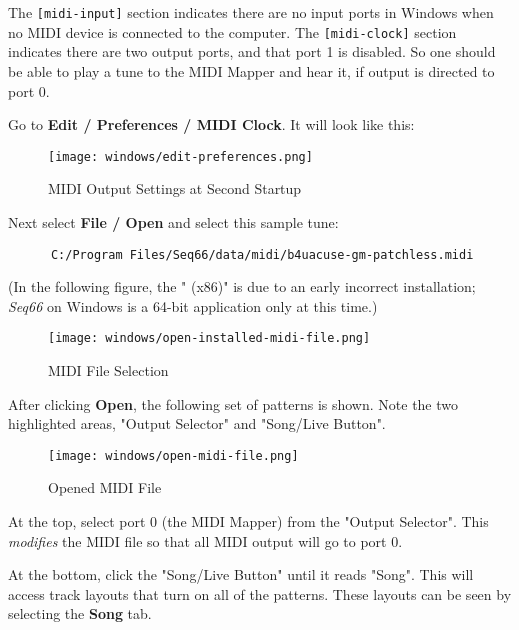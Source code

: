    The \texttt{[midi-input]} section indicates there are no input ports
   in Windows when no MIDI device is connected to the computer.
   The \texttt{[midi-clock]} section indicates there are two output
   ports, and that port 1 is disabled.   So one should be able to
   play a tune to the MIDI Mapper and hear it, if output is directed
   to port 0.

   Go to \textbf{Edit / Preferences / MIDI Clock}.
   It will look like this:

\begin{figure}[H]
   \centering 
   \texttt{[image: windows/edit-preferences.png]}
   \caption{MIDI Output Settings at Second Startup}
   \label{fig:windows_output_settings_second_startup}
\end{figure}

   Next select \textbf{File / Open} and select this sample tune:

   \begin{verbatim}
      C:/Program Files/Seq66/data/midi/b4uacuse-gm-patchless.midi
   \end{verbatim}

   (In the following figure, the " (x86)" is due to an early incorrect
   installation; \textsl{Seq66} on Windows is a 64-bit application only
   at this time.)

\begin{figure}[H]
   \centering 
   \texttt{[image: windows/open-installed-midi-file.png]}
   \caption{MIDI File Selection}
   \label{fig:windows_open_installed_midi_file}
\end{figure}

   After clicking \textbf{Open}, the following set of patterns is shown.
   Note the two highlighted areas, "Output Selector" and "Song/Live Button".

\begin{figure}[H]
   \centering 
   \texttt{[image: windows/open-midi-file.png]}
   \caption{Opened MIDI File}
   \label{fig:windows_open_midi_file}
\end{figure}

   At the top, select port 0 (the MIDI Mapper) from the "Output Selector".
   This \textsl{modifies} the MIDI file so that all MIDI
   output will go to port 0.

   At the bottom, click the "Song/Live Button" until it reads "Song".
   This will access track layouts that turn on all of the patterns.
   These layouts can be seen by selecting the \textbf{Song} tab.


